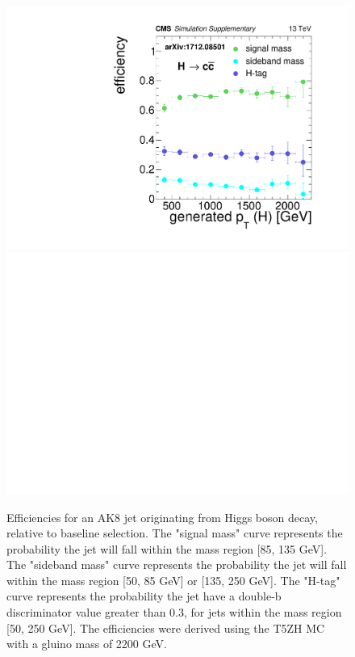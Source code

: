 \begin{figure}[hbp!]
\includegraphics[width=0.45\linewidth]{figs/CMS-SUS-17-006_Figure-aux_010.pdf}
\includegraphics[width=0.45\linewidth]{figs/blankcanvas.pdf}
\caption{
Efficiencies for an AK8 jet originating from Higgs boson decay, relative to baseline selection.
The "signal mass" curve represents the probability the jet will fall within the mass region [85, 135 GeV].
The "sideband mass" curve represents the probability the jet will fall within the mass region [50, 85 GeV] or [135, 250 GeV].
The "H-tag" curve represents the probability the jet have a double-b discriminator value greater than 0.3, for jets within the mass region [50, 250 GeV].
The efficiencies were derived using the T5ZH MC with a gluino mass of 2200 GeV.
}
\label{fig:effH}
\end{figure}

